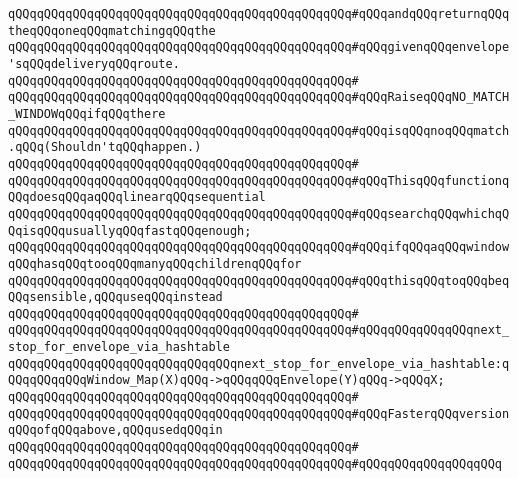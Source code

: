 \verb|qQQqqQQqqQQqqQQqqQQqqQQqqQQqqQQqqQQqqQQqqQQqqQQq#qQQqandqQQqreturnqQQqtheqQQqoneqQQqmatchingqQQqthe|\newline
\verb|qQQqqQQqqQQqqQQqqQQqqQQqqQQqqQQqqQQqqQQqqQQqqQQq#qQQqgivenqQQqenvelope'sqQQqdeliveryqQQqroute.|\newline
\verb|qQQqqQQqqQQqqQQqqQQqqQQqqQQqqQQqqQQqqQQqqQQqqQQq#|\newline
\verb|qQQqqQQqqQQqqQQqqQQqqQQqqQQqqQQqqQQqqQQqqQQqqQQq#qQQqRaiseqQQqNO_MATCH_WINDOWqQQqifqQQqthere|\newline
\verb|qQQqqQQqqQQqqQQqqQQqqQQqqQQqqQQqqQQqqQQqqQQqqQQq#qQQqisqQQqnoqQQqmatch.qQQq(Shouldn'tqQQqhappen.)|\newline
\verb|qQQqqQQqqQQqqQQqqQQqqQQqqQQqqQQqqQQqqQQqqQQqqQQq#|\newline
\verb|qQQqqQQqqQQqqQQqqQQqqQQqqQQqqQQqqQQqqQQqqQQqqQQq#qQQqThisqQQqfunctionqQQqdoesqQQqaqQQqlinearqQQqsequential|\newline
\verb|qQQqqQQqqQQqqQQqqQQqqQQqqQQqqQQqqQQqqQQqqQQqqQQq#qQQqsearchqQQqwhichqQQqisqQQqusuallyqQQqfastqQQqenough;|\newline
\verb|qQQqqQQqqQQqqQQqqQQqqQQqqQQqqQQqqQQqqQQqqQQqqQQq#qQQqifqQQqaqQQqwindowqQQqhasqQQqtooqQQqmanyqQQqchildrenqQQqfor|\newline
\verb|qQQqqQQqqQQqqQQqqQQqqQQqqQQqqQQqqQQqqQQqqQQqqQQq#qQQqthisqQQqtoqQQqbeqQQqsensible,qQQquseqQQqinstead|\newline
\verb|qQQqqQQqqQQqqQQqqQQqqQQqqQQqqQQqqQQqqQQqqQQqqQQq#|\newline
\verb|qQQqqQQqqQQqqQQqqQQqqQQqqQQqqQQqqQQqqQQqqQQqqQQq#qQQqqQQqqQQqqQQqnext_stop_for_envelope_via_hashtable|\newline
\newline
\verb|qQQqqQQqqQQqqQQqqQQqqQQqqQQqqQQqnext_stop_for_envelope_via_hashtable:qQQqqQQqqQQqWindow_Map(X)qQQq->qQQqqQQqEnvelope(Y)qQQq->qQQqX;|\newline
\verb|qQQqqQQqqQQqqQQqqQQqqQQqqQQqqQQqqQQqqQQqqQQqqQQq#|\newline
\verb|qQQqqQQqqQQqqQQqqQQqqQQqqQQqqQQqqQQqqQQqqQQqqQQq#qQQqFasterqQQqversionqQQqofqQQqabove,qQQqusedqQQqin|\newline
\verb|qQQqqQQqqQQqqQQqqQQqqQQqqQQqqQQqqQQqqQQqqQQqqQQq#|\newline
\verb|qQQqqQQqqQQqqQQqqQQqqQQqqQQqqQQqqQQqqQQqqQQqqQQq#qQQqqQQqqQQqqQQqqQQq|\newline
\newline
